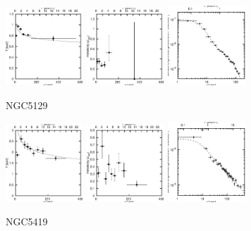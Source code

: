 \documentclass[structabstract]{aa}
\begin{document}
\begin{figure}[!h]
   \centering
   \includegraphics[width=0.26\textwidth]{tprofile_ngc5129.eps}
   \includegraphics[width=0.26\textwidth]{zprofile_ngc5129.eps}
   \includegraphics[width=0.26\textwidth]{sbps_ngc5129.eps}
   \caption{NGC5129}
   \label{fig:tprofngc5129}%
\end{figure}
\clearpage
\begin{figure}[h]
   \centering
   \includegraphics[width=0.26\textwidth]{tprofile_ngc5419.eps}
   \includegraphics[width=0.26\textwidth]{zprofile_ngc5419.eps}
   \includegraphics[width=0.26\textwidth]{sbps_ngc5419.eps}
   \caption{NGC5419}
   \label{fig:tprofngc5419}%
\end{figure}
\end{document}
